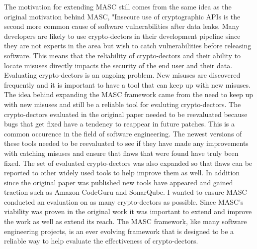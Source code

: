 The motivation for extending MASC still comes from the same idea as the original motivation behind MASC, "Insecure use of cryptographic APIs is the second more common cause of software vulnerabilities after data leaks. Many developers are likely to use crypto-dectors in their development pipeline since they are not experts in the area but wish to catch vulnerabilities before releasing software. This means that the reliability of crypto-dectors and their ability to locate misuses directly impacts the security of the end user and their data. Evaluating crypto-dectors is an ongoing problem. New misuses are discovered frequently and it is important to have a tool that can keep up with new misuses. The idea behind expanding the MASC framework came from the need to keep up with new misuses and still be a reliable tool for evaluting crypto-dectors. 
The crypto-dectors evaluated in the original paper needed to be reevaluated because bugs that get fixed have a tendency to reappear in future patches. This is a common occurence in the field of software engineering. The newest versions of these tools needed to be reevaluated to see if they have made any improvements with catching misuses and ensure that flaws that were found have truly been fixed. The set of evaluated crypto-dectors was also expanded so that flaws can be reported to other widely used tools to help improve them as well. In addition since the original paper was published new tools have appeared and gained traction such as Amazon CodeGuru and SonarQube. I wanted to ensure MASC conducted an evaluation on as many crypto-dectors as possible. Since MASC's viability was proven in the original work it was important to extend and improve the work as well as extend its reach. The MASC framework, like many software engineering projects, is an ever evolving framework that is designed to be a reliable way to help evaluate the effectiveness of crypto-dectors.
